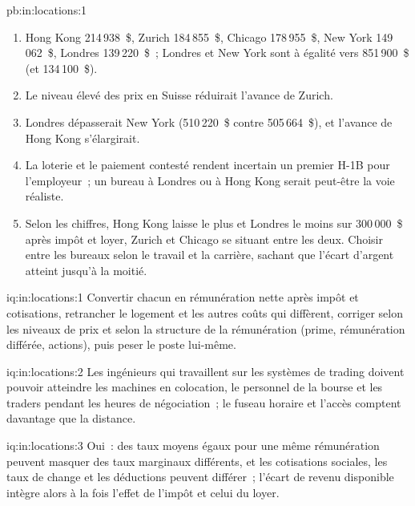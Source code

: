 \begin{solution}{pb:in:locations:1}
\begin{enumerate}
\item Hong Kong 214\,938~\$, Zurich 184\,855~\$, Chicago 178\,955~\$, New York 149\,062~\$, Londres 139\,220~\$~; Londres et New
York sont à égalité vers 851\,900~\$ (et 134\,100~\$).
\item Le niveau élevé des prix en Suisse réduirait l'avance de Zurich.
\item Londres dépasserait New York (510\,220~\$ contre 505\,664~\$), et l'avance de Hong Kong s'élargirait.
\item La loterie et le paiement contesté rendent incertain un premier H-1B pour l'employeur~; un bureau à Londres ou à Hong
Kong serait peut-être la voie réaliste.
\item Selon les chiffres, Hong Kong laisse le plus et Londres le moins sur 300\,000~\$ après impôt et loyer, Zurich et
Chicago se situant entre les deux. Choisir entre les bureaux selon le travail et la carrière, sachant que l'écart d'argent atteint jusqu'à la moitié.
\end{enumerate}
\end{solution}

\begin{solution}{iq:in:locations:1}
Convertir chacun en rémunération nette après impôt et cotisations, retrancher le logement et les autres coûts qui diffèrent, corriger selon les niveaux de prix
et selon la structure de la rémunération (prime, rémunération différée, actions), puis peser le poste lui-même.
\end{solution}

\begin{solution}{iq:in:locations:2}
Les ingénieurs qui travaillent sur les systèmes de trading doivent pouvoir atteindre les machines en colocation, le personnel de la bourse et les traders
pendant les heures de négociation~; le fuseau horaire et l'accès comptent davantage que la distance.
\end{solution}

\begin{solution}{iq:in:locations:3}
Oui~: des taux moyens égaux pour une même rémunération peuvent masquer des taux marginaux différents, et les cotisations sociales, les taux de change et les
déductions peuvent différer~; l'écart de revenu disponible intègre alors à la fois l'effet de l'impôt et celui du loyer.
\end{solution}

